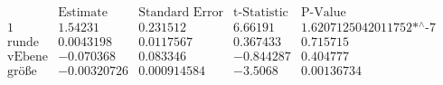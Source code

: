 \[\begin{array}{l|llll}
 \text{} & \text{Estimate} & \text{Standard Error} & \text{t-Statistic} & \text{P-Value} \\
\hline
 1 & 1.54231 & 0.231512 & 6.66191 & \text{1.6207125042011752$\grave{ }$*${}^{\wedge}$-7} \\
 \text{runde} & 0.0043198 & 0.0117567 & 0.367433 & 0.715715 \\
 \text{vEbene} & -0.070368 & 0.083346 & -0.844287 & 0.404777 \\
 \text{gr{\" o}{\ss}e} & -0.00320726 & 0.000914584 & -3.5068 & 0.00136734 \\
\end{array}\]

